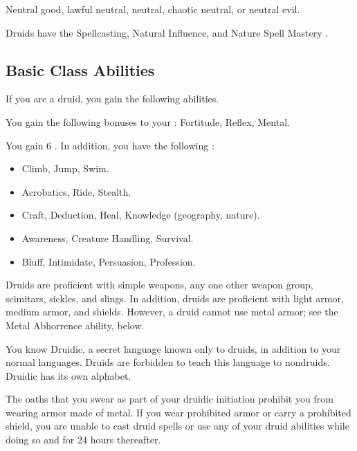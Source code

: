      Neutral good, lawful neutral, neutral, chaotic neutral, or neutral evil.

     Druids have the Spellcasting, Natural Influence, and Nature Spell Mastery .

    \subsection{Basic Class Abilities}
        If you are a druid, you gain the following abilities.

        You gain the following bonuses to your :  Fortitude,  Reflex,  Mental.

        You gain 6 .
        In addition, you have the following :
        \begin{itemize}
            \item {} Climb, Jump, Swim.
            \item {} Acrobatics, Ride, Stealth.
            \item {} Craft, Deduction, Heal, Knowledge (geography, nature).
            \item {} Awareness, Creature Handling, Survival.
            \item {} Bluff, Intimidate, Persuasion, Profession.
        \end{itemize}

        Druids are proficient with simple weapons, any one other weapon group, scimitars, sickles, and slings.
        In addition, druids are proficient with light armor, medium armor, and shields.
        However, a druid cannot use metal armor; see the Metal Abhorrence ability, below.

        You know Druidic, a secret language known only to druids, in addition to your normal languages.
        Druids are forbidden to teach this language to nondruids.
        Druidic has its own alphabet.

        The oaths that you swear as part of your druidic initiation prohibit you from wearing armor made of metal.
        If you wear prohibited armor or carry a prohibited shield, you are unable to cast druid spells or use any of your  druid abilities while doing so and for 24 hours thereafter.

